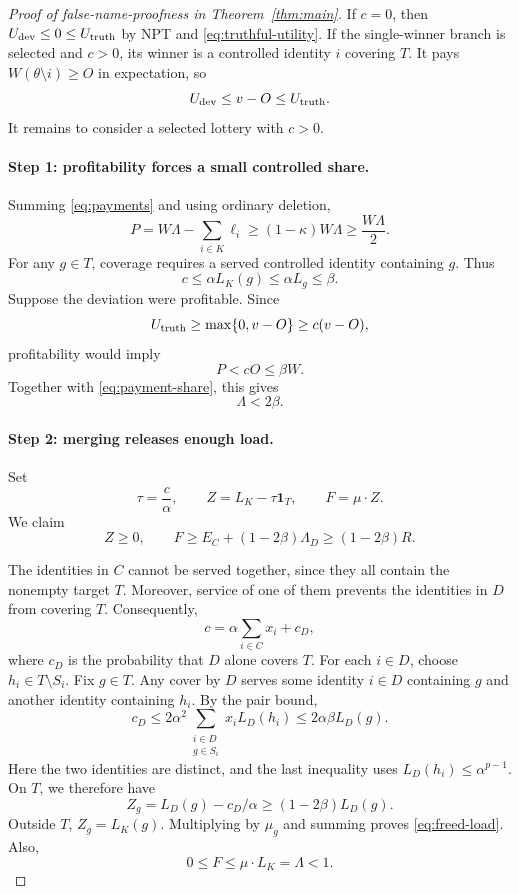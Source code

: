 \documentclass[11pt]{article}
\begin{document}
\begin{proof}[Proof of false-name-proofness in
Theorem~\ref{thm:main}]
If $c=0$, then
$U_{\rm dev}\le0\le U_{\rm truth}$
by NPT and \eqref{eq:truthful-utility}.
If the single-winner branch is selected and $c>0$, its winner
is a controlled identity $i$ covering $T$.
It pays $W(\theta\setminus i)\ge O$ in expectation, so
\[
U_{\rm dev}\le v-O\le U_{\rm truth}.
\]
It remains to consider a selected lottery with $c>0$.

\paragraph{Step 1: profitability forces a small controlled share.}
Summing \eqref{eq:payments} and using ordinary deletion,
\begin{equation}
\label{eq:payment-share}
P
=W\Lambda-\sum_{i\in K}\ell_i
\ge(1-\kappa)W\Lambda
\ge\frac{W\Lambda}{2}.
\end{equation}
For any $g\in T$, coverage requires a served controlled identity
containing $g$.
Thus
\begin{equation}
\label{eq:coverage-cap}
c\le\alpha L_K(g)\le\alpha L_g\le\beta.
\end{equation}
Suppose the deviation were profitable.
Since
\[
U_{\rm truth}
\ge\max\{0,v-O\}
\ge c(v-O),
\]
profitability would imply
\[
P<cO\le\beta W.
\]
Together with \eqref{eq:payment-share}, this gives
\begin{equation}
\label{eq:small-share}
\Lambda<2\beta.
\end{equation}

\paragraph{Step 2: merging releases enough load.}
Set
\[
\tau=\frac c\alpha,
\qquad
Z=L_K-\tau\mathbf{1}_T,
\qquad
F=\mu\cdot Z.
\]
We claim
\begin{equation}
\label{eq:freed-load}
Z\ge0,
\qquad
F\ge E_C+(1-2\beta)\Lambda_D
\ge(1-2\beta)R.
\end{equation}

The identities in $C$ cannot be served together, since they all
contain the nonempty target $T$.
Moreover, service of one of them prevents the identities in $D$
from covering $T$.
Consequently,
\[
c=\alpha\sum_{i\in C}x_i+c_D,
\]
where $c_D$ is the probability that $D$ alone covers $T$.
For each $i\in D$, choose $h_i\in T\setminus S_i$.
Fix $g\in T$.
Any cover by $D$ serves some identity $i\in D$ containing $g$
and another identity containing $h_i$.
By the pair bound,
\begin{equation}
\label{eq:noncarrier-coverage}
c_D
\le
2\alpha^2
\sum_{\substack{i\in D\\g\in S_i}}x_iL_D(h_i)
\le2\alpha\beta L_D(g).
\end{equation}
Here the two identities are distinct, and the last inequality
uses $L_D(h_i)\le\alpha^{p-1}$.
On $T$, we therefore have
\[
Z_g=L_D(g)-c_D/\alpha
\ge(1-2\beta)L_D(g).
\]
Outside $T$, $Z_g=L_K(g)$.
Multiplying by $\mu_g$ and summing proves
\eqref{eq:freed-load}.
Also,
\[
0\le F\le\mu\cdot L_K=\Lambda<1.
\]


\end{proof}
\end{document}
